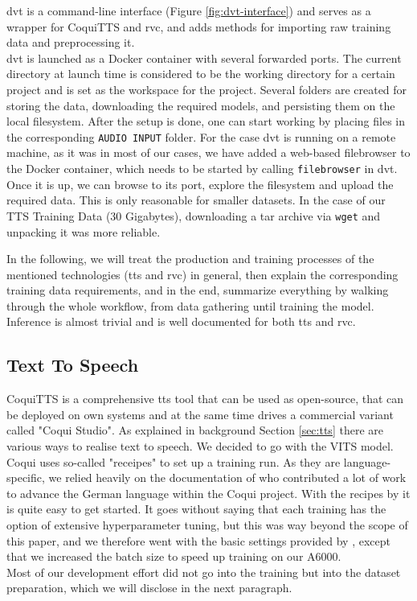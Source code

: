 \documentclass[
  a4paper,  %
  twoside,  %
  bibliography=totoc,
  headsepline,
  cleardoublepage=empty,
  parskip=half,
  draft=false
]{scrbook}
\begin{document}
\gls{dvt} is a command-line interface (Figure \ref{fig:dvt-interface}) and serves as a wrapper for CoquiTTS and \gls{rvc}, and adds methods for importing raw training data and preprocessing it. \\
\gls{dvt} is launched as a Docker container with several forwarded ports. The current directory at launch time is considered to be the working directory for a certain project and is set as the workspace for the project. Several folders are created for storing the data, downloading the required models, and persisting them on the local filesystem. After the setup is done, one can start working by placing files in the corresponding \verb|AUDIO INPUT| folder. For the case \gls{dvt} is running on a remote machine, as it was in most of our cases, we have added a web-based filebrowser to the Docker container, which needs to be started by calling \verb|filebrowser| in \gls{dvt}. Once it is up, we can browse to its port, explore the filesystem and upload the required data. This is only reasonable for smaller datasets. In the case of our TTS Training Data (30 Gigabytes), downloading a tar archive via \verb|wget| and unpacking it was more reliable. 

In the following, we will treat the production and training processes of the mentioned technologies (\gls{tts} and \gls{rvc}) in general, then explain the corresponding training data requirements, and in the end, summarize everything by walking through the whole workflow, from data gathering until training the model. Inference is almost trivial and is well documented for both \gls{tts} and \gls{rvc}.

\subsection{Text To Speech}
CoquiTTS is a comprehensive \gls*{tts} tool that can be used as open-source, that can be deployed on own systems and at the same time drives a commercial variant called "Coqui Studio". As explained in background Section \ref{sec:tts} there are various ways to realise text to speech. We decided to go with the VITS model. Coqui uses so-called "receipes" to set up a training run. As they are language-specific, we relied heavily on the documentation of  who contributed a lot of work to advance the German language within the Coqui project.
With the recipes by  it is quite easy to get started. It goes without saying that each training has the option of extensive hyperparameter tuning, but this was way beyond the scope of this paper, and we therefore went with the basic settings provided by , except that we increased the batch size to speed up training on our A6000. \\
Most of our development effort did not go into the training but into the dataset preparation, which we will disclose in the next paragraph.
\end{document}
